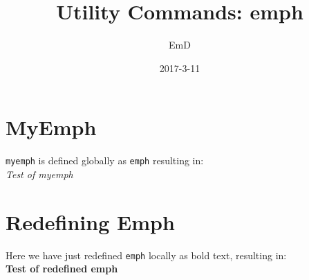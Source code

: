 \documentclass{article}
\title{Utility Commands: emph}
\author{EmD}
\date{2017-3-11}
\let\myemph\emph
\renewcommand{\emph}[1]{\textbf{#1}}
\begin{document}
\maketitle

\section*{MyEmph}
\texttt{myemph} is defined globally as \texttt{emph} resulting in: \\

\myemph{Test of myemph}

\section*{Redefining Emph}

Here we have just redefined \texttt{emph} locally as bold text, resulting in: \\

\emph{Test of redefined emph}
\end{document}
